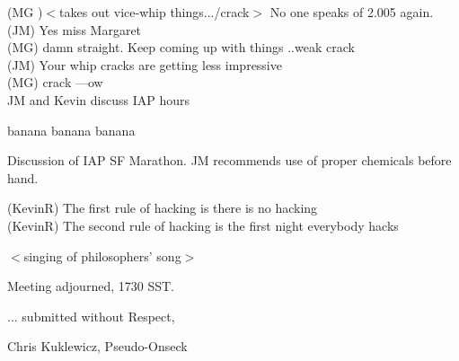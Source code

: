 \documentclass[10pt]{article}
\begin{document}
(MG )$<$takes out vice-whip things.../crack$>$ No one speaks of 2.005 again.\\
(JM) Yes miss Margaret\\
(MG) damn straight.  Keep coming up with things ..weak crack\\
(JM) Your whip cracks are getting less impressive\\
(MG) crack ---ow\\

JM and Kevin discuss IAP hours

banana banana banana

Discussion of IAP SF Marathon.
JM recommends use of proper chemicals before hand.

(KevinR) The first rule of hacking is there is no hacking\\
(KevinR) The second rule of hacking is the first night everybody hacks

$<$singing of philosophers' song$>$

\vspace{12pt}

\noindent
Meeting adjourned, 1730 SST.

\vspace{18pt}

\centerline{... submitted without Respect,}
\centerline{Chris Kuklewicz, Pseudo-Onseck}
\end{document}
